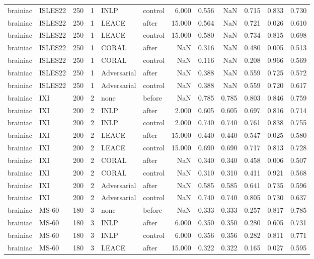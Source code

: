 \begin{tabular}{llrrllrrrrrr}
brainiac & ISLES22 & 250 & 1 & INLP & control & 6.000 & 0.556 & NaN & 0.715 & 0.833 & 0.730 \\
brainiac & ISLES22 & 250 & 1 & LEACE & after & 15.000 & 0.564 & NaN & 0.721 & 0.026 & 0.610 \\
brainiac & ISLES22 & 250 & 1 & LEACE & control & 15.000 & 0.580 & NaN & 0.734 & 0.815 & 0.698 \\
brainiac & ISLES22 & 250 & 1 & CORAL & after & NaN & 0.316 & NaN & 0.480 & 0.005 & 0.513 \\
brainiac & ISLES22 & 250 & 1 & CORAL & control & NaN & 0.116 & NaN & 0.208 & 0.966 & 0.569 \\
brainiac & ISLES22 & 250 & 1 & Adversarial & after & NaN & 0.388 & NaN & 0.559 & 0.725 & 0.572 \\
brainiac & ISLES22 & 250 & 1 & Adversarial & control & NaN & 0.388 & NaN & 0.559 & 0.720 & 0.617 \\
brainiac & IXI & 200 & 2 & none & before & NaN & 0.785 & 0.785 & 0.803 & 0.846 & 0.759 \\
brainiac & IXI & 200 & 2 & INLP & after & 2.000 & 0.605 & 0.605 & 0.697 & 0.816 & 0.714 \\
brainiac & IXI & 200 & 2 & INLP & control & 2.000 & 0.740 & 0.740 & 0.761 & 0.838 & 0.755 \\
brainiac & IXI & 200 & 2 & LEACE & after & 15.000 & 0.440 & 0.440 & 0.547 & 0.025 & 0.580 \\
brainiac & IXI & 200 & 2 & LEACE & control & 15.000 & 0.690 & 0.690 & 0.717 & 0.813 & 0.728 \\
brainiac & IXI & 200 & 2 & CORAL & after & NaN & 0.340 & 0.340 & 0.458 & 0.006 & 0.507 \\
brainiac & IXI & 200 & 2 & CORAL & control & NaN & 0.310 & 0.310 & 0.411 & 0.921 & 0.568 \\
brainiac & IXI & 200 & 2 & Adversarial & after & NaN & 0.585 & 0.585 & 0.641 & 0.735 & 0.596 \\
brainiac & IXI & 200 & 2 & Adversarial & control & NaN & 0.740 & 0.740 & 0.805 & 0.730 & 0.637 \\
brainiac & MS-60 & 180 & 3 & none & before & NaN & 0.333 & 0.333 & 0.257 & 0.817 & 0.785 \\
brainiac & MS-60 & 180 & 3 & INLP & after & 6.000 & 0.350 & 0.350 & 0.280 & 0.605 & 0.731 \\
brainiac & MS-60 & 180 & 3 & INLP & control & 6.000 & 0.356 & 0.356 & 0.282 & 0.811 & 0.771 \\
brainiac & MS-60 & 180 & 3 & LEACE & after & 15.000 & 0.322 & 0.322 & 0.165 & 0.027 & 0.595 \\

\end{tabular}
